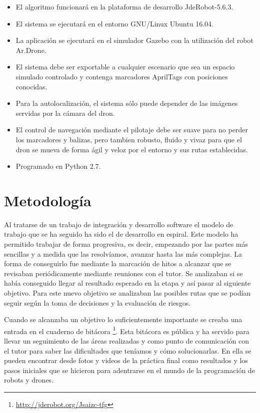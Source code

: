 \begin{itemize}
		\item El algoritmo funcionará en la plataforma de desarrollo JdeRobot-5.6.3.
		\item El sistema se ejecutará en el entorno GNU/Linux Ubuntu 16.04.
		\item La aplicación se ejecutará en el simulador Gazebo con la utilización del robot Ar.Drone.
		\item El sistema debe ser exportable a cualquier escenario que sea un espacio simulado controlado y contenga marcadores AprilTags con posiciones conocidas.
		\item Para la autolocalización, el sistema sólo puede depender de las imágenes servidas por la cámara del dron.
		\item El control de navegación mediante el pilotaje debe ser suave para no perder los marcadores y balizas, pero tambien robusto, fluido y vivaz para que el dron se mueva de forma ágil y veloz por el entorno y sus rutas establecidas.
		\item Programado en Python 2.7.
\end{itemize}


\section{Metodología}
\hspace{1cm} Al tratarse de un trabajo de integración y desarrollo software el modelo de trabajo que se ha seguido ha sido el de desarrollo en espiral. Este modelo ha permitido trabajar de forma progresiva, es decir, empezando por las partes más sencillas y a medida que las resolvíamos, avanzar hasta las más complejas. La forma de conseguirlo fue mediante la marcación de hitos a alcanzar que se revisaban periódicamente mediante reuniones con el tutor. Se analizaban si se había conseguido llegar al resultado esperado en la etapa y así pasar al siguiente objetivo. Para este nuevo objetivo se analizaban las posibles rutas que se podían seguir según la toma de decisiones y la evaluación de riesgos.

\hspace{1cm} Cuando se alcanzaba un objetivo lo suficientemente importante se creaba una entrada en el cuaderno de bitácora \footnote{\url{http://jderobot.org/Jsaizc-tfg}}. Esta bitácora es pública y ha servido para llevar un seguimiento de las áreas realizadas y como punto de comunicación con el tutor para saber las dificultades que teníamos y cómo solucionarlas. En ella se pueden encontrar desde fotos y videos de la práctica final como resultados y los pasos iniciales que se hicieron para adentrarse en el mundo de la programación de robots y drones.

